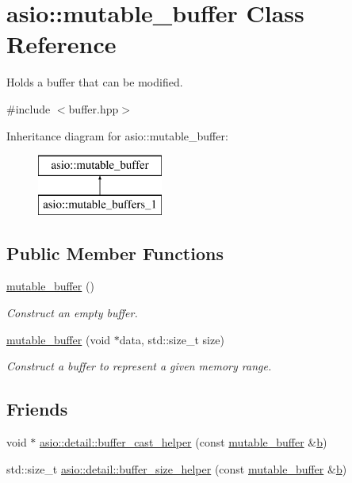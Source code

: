 \hypertarget{classasio_1_1mutable__buffer}{}\section{asio\+:\+:mutable\+\_\+buffer Class Reference}
\label{classasio_1_1mutable__buffer}


Holds a buffer that can be modified.  




{\ttfamily \#include $<$buffer.\+hpp$>$}

Inheritance diagram for asio\+:\+:mutable\+\_\+buffer\+:\begin{figure}[H]
\begin{center}
\leavevmode
\includegraphics[height=2.000000cm]{classasio_1_1mutable__buffer}
\end{center}
\end{figure}
\subsection*{Public Member Functions}
\begin{DoxyCompactItemize}
\item 
\hyperlink{classasio_1_1mutable__buffer_aee716832cf56a039b5aeb057aeb8bfec}{mutable\+\_\+buffer} ()
\begin{DoxyCompactList}\small\item\em Construct an empty buffer. \end{DoxyCompactList}\item 
\hyperlink{classasio_1_1mutable__buffer_ac2102b19275bd6af5bd22eef5599de5b}{mutable\+\_\+buffer} (void $\ast$data, std\+::size\+\_\+t size)
\begin{DoxyCompactList}\small\item\em Construct a buffer to represent a given memory range. \end{DoxyCompactList}\end{DoxyCompactItemize}
\subsection*{Friends}
\begin{DoxyCompactItemize}
\item 
void $\ast$ \hyperlink{classasio_1_1mutable__buffer_a8ef94376754bcdbb4e9ec8a372b3e26e}{asio\+::detail\+::buffer\+\_\+cast\+\_\+helper} (const \hyperlink{classasio_1_1mutable__buffer}{mutable\+\_\+buffer} \&\hyperlink{group__async__read_ga945a5c18fa77a9e2eba420f8f44b2a4f}{b})
\item 
std\+::size\+\_\+t \hyperlink{classasio_1_1mutable__buffer_adf2d9d6967b90d825474bea8fcc2acd4}{asio\+::detail\+::buffer\+\_\+size\+\_\+helper} (const \hyperlink{classasio_1_1mutable__buffer}{mutable\+\_\+buffer} \&\hyperlink{group__async__read_ga945a5c18fa77a9e2eba420f8f44b2a4f}{b})
\end{DoxyCompactItemize}
